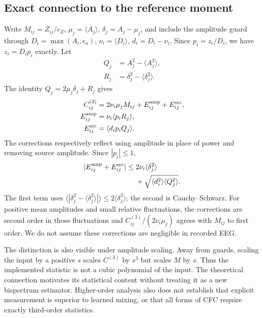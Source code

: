 \documentclass[10pt,twocolumn,letterpaper]{article}
\begin{document}
\subsection{Exact connection to the reference moment}
Write $M_{ij}=Z_{ij}/c_Z$, $\mu_j=\langle A_j\rangle$,
$\delta_j=A_j-\mu_j$, and include the amplitude guard through
$D_i=\max(A_i,\epsilon_a)$, $\nu_i=\langle D_i\rangle$,
$d_i=D_i-\nu_i$. Since $p_i=z_i/D_i$, we have $z_i=D_i p_i$
exactly. Let
\begin{equation}
\begin{aligned}
Q_j&=A_j^2-\langle A_j^2\rangle,\\
R_j&=\delta_j^2-\langle\delta_j^2\rangle.
\end{aligned}
\label{eq:corrections}
\end{equation}
The identity $Q_j=2\mu_j\delta_j+R_j$ gives
\begin{equation}
\begin{aligned}
C^{(3)}_{ij}&=2\nu_i\mu_jM_{ij}
+E^{\rm amp}_{ij}+E^{\rm src}_{ij},\\
E^{\rm amp}_{ij}&=\nu_i\langle p_iR_j\rangle,\\
E^{\rm src}_{ij}&=\langle d_ip_iQ_j\rangle.
\end{aligned}
\label{eq:decomposition}
\end{equation}
The corrections respectively reflect using amplitude in place of power
and removing source amplitude. Since $|p_i|\leq1$,
\begin{equation}
\begin{split}
|E^{\rm amp}_{ij}+E^{\rm src}_{ij}|
\leq{}&2\nu_i\langle\delta_j^2\rangle\\
&+\sqrt{\langle d_i^2\rangle\langle Q_j^2\rangle}.
\end{split}
\label{eq:bound}
\end{equation}
The first term uses
$\langle|\delta_j^2-\langle\delta_j^2\rangle|\rangle
\leq2\langle\delta_j^2\rangle$; the second is Cauchy--Schwarz.
For positive mean amplitudes and small relative fluctuations, the
corrections are second order in those fluctuations and
$C^{(3)}_{ij}/(2\nu_i\mu_j)$ agrees with $M_{ij}$ to first order.
We do not assume these corrections are negligible in recorded EEG.

The distinction is also visible under amplitude scaling. Away from
guards, scaling the input by a positive $s$ scales $C^{(3)}$ by $s^3$
but scales $M$ by $s$. Thus the implemented statistic is not a cubic
polynomial of the input. The theoretical connection motivates its
statistical content without treating it as a new bispectrum estimator.
Higher-order analysis also does not establish that explicit measurement
is superior to learned mixing, or that all forms of CFC require exactly
third-order statistics.
\end{document}
